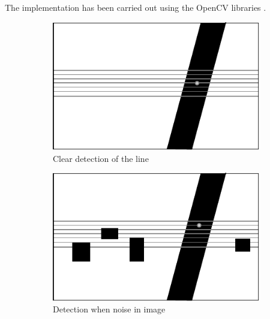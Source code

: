 	The implementation has been carried out using the OpenCV libraries \cite{opencv}.
		\begin{figure}
	        \centering
	        \begin{subfigure}[H]{0.296\textwidth}
	            \includegraphics[width=\textwidth]{figs/mr_camera_processing_1}
	            \caption{Clear detection of the line}
	            \label{fig:mr_camera_processing_1}
	        \end{subfigure}
	        \hspace{20pt}
	        \begin{subfigure}[H]{0.296\textwidth}
	            \includegraphics[width=\textwidth]{figs/mr_camera_processing_2}
	            \caption{Detection when noise in image}
	            \label{fig:mr_camera_processing_2}
	    	\end{subfigure}
	        \hspace{20pt}
	    	\begin{subfigure}[H]{0.296\textwidth}

\end{subfigure}
\end{figure}
